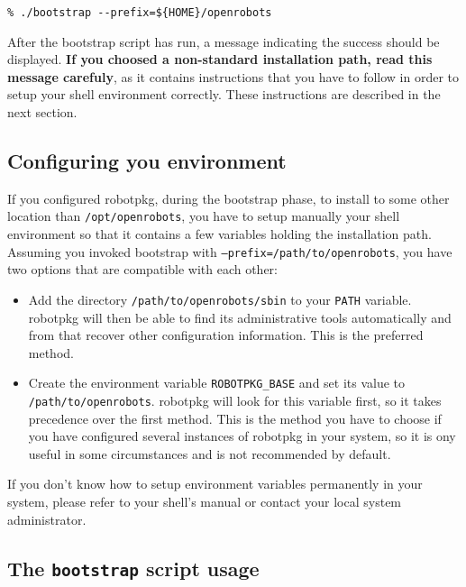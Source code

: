 \begin{verbatim}
% ./bootstrap --prefix=${HOME}/openrobots
\end{verbatim}

After the bootstrap script has run, a message  indicating the success should be
displayed.   {\bf If you choosed  a  non-standard installation path, read  this
message carefuly}, as it contains instructions that you have to follow in order
to setup your shell environment correctly.  These instructions are described in
the next section.


\subsection{Configuring you environment} %

If  you configured robotpkg,   during the bootstrap  phase,  to install to some
other location   than {\tt /opt/openrobots}, you  have   to setup manually your
shell environment so that it contains a few  variables holding the installation
path.  Assuming  you invoked bootstrap with {\tt --prefix=/path/to/openrobots},
you have two options that are compatible with each other:

\begin{itemize}
   \item Add  the directory {\tt  /path/to/openrobots/sbin}  to your {\tt PATH}
   variable. robotpkg will    then be able  to find    its administrative tools
   automatically and from that recover other configuration information. This is
   the preferred method.

   \item Create the environment variable {\tt ROBOTPKG\_BASE} and set its value
   to {\tt  /path/to/openrobots}.  robotpkg will  look for this variable first,
   so it takes precedence over the  first method.  This  is the method you have
   to  choose if you  have  configured several  instances of  robotpkg in  your
   system, so it is ony useful in some circumstances  and is not recommended by
   default.
\end{itemize}

If  you  don't know  how  to setup   environment variables  permanently in your
system,  please  refer  to  your shell's  manual  or contact  your local system
administrator.


\subsection{The {\tt bootstrap} script usage} %

